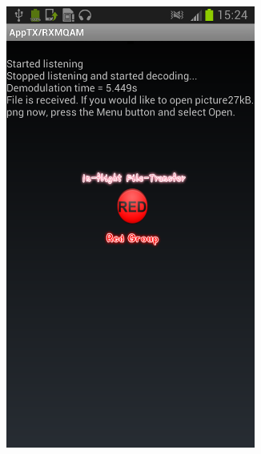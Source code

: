 \documentclass[12pt,a4paper,openright]{report}
\begin{document}
\begin{figure}[H]
\begin{subfigure}{.3\textwidth}
      \includegraphics[width=0.9\textwidth]{filereceived.png}
      \label{fig:appRXside}
   \end{subfigure}
    \begin{subfigure}{.3\textwidth}
     	 \centering

\end{subfigure}
\end{figure}
\end{document}

